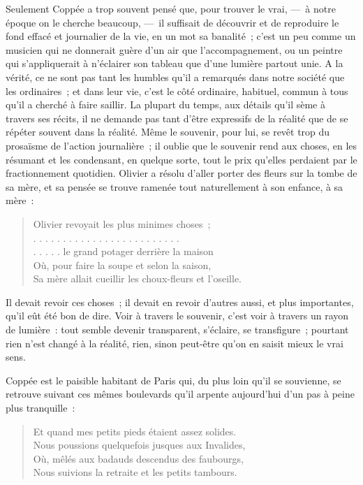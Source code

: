 \documentclass[french,twoside]{book} %
\begin{document}
\noindent Seulement Coppée a trop souvent pensé que, pour trouver le vrai, — à notre époque on le cherche beaucoup, — il suffisait de découvrir et de reproduire le fond effacé et journalier de la vie, en un mot sa banalité ; c’est un peu comme un musicien qui ne donnerait guère d’un air que l’accompagnement, ou un peintre qui s’appliquerait à n’éclairer son tableau que d’une lumière partout unie. A la vérité, ce ne sont pas tant les humbles qu’il a remarqués dans notre société que les ordinaires ; et dans leur vie, c’est le côté ordinaire, habituel, commun à tous qu’il a cherché à faire saillir. La plupart du temps, aux détails qu’il sème à travers ses récits, il ne demande pas tant d’être expressifs de la réalité que de se répéter souvent dans la réalité. Même le souvenir, pour lui, se revêt trop du prosaïsme de l’action journalière ; il oublie que le souvenir rend aux choses, en les résumant et les condensant, en quelque sorte, tout le prix qu’elles perdaient par le fractionnement quotidien. Olivier a résolu d’aller porter des fleurs sur la tombe de sa mère, et sa pensée se trouve ramenée tout naturellement à son enfance, à sa mère :\par


\begin{verse}
Olivier revoyait les plus minimes choses ;\\
. . . . . . . . . . . . . . . . . . . . . . . . .\\
. . . . . le grand potager derrière la maison\\
Où, pour faire la soupe et selon la saison,\\
Sa mère allait cueillir les choux-fleurs et l’oseille.\\
\end{verse}

\noindent Il devait revoir ces choses ; il devait en revoir d’autres aussi, et plus importantes, qu’il eût été bon de dire. Voir à travers le souvenir, c’est voir à travers un rayon de lumière : tout semble devenir transparent, s’éclaire, se transfigure ; pourtant rien n’est changé à la réalité, rien, sinon peut-être qu’on en saisit mieux le vrai sens.\par
Coppée est le paisible habitant de Paris qui, du plus loin qu’il se souvienne, se retrouve suivant ces mêmes boulevards qu’il arpente aujourd’hui d’un pas à peine plus tranquille :\par


\begin{verse}
Et quand mes petits pieds étaient assez solides.\\
Nous poussions quelquefois jusques aux Invalides,\\
Où, mêlés aux badauds descendus des faubourgs,\\
Nous suivions la retraite et les petits tambours.\\
\end{verse}
\end{document}
